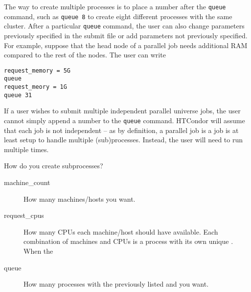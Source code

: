 
The way to create multiple processes is to place a number after the \verb=queue= 
command, such as \verb=queue 8= to create eight different processes with the 
same cluster. After a particular \verb=queue= command, the user can also change 
parameters previously specified in the submit file or add parameters not 
previously specified. For example, suppose that the head node of a parallel job 
needs additional RAM compared to the rest of the nodes. The user can write

\begin{verbatim}
request_memory = 5G
queue
request_meory = 1G
queue 31
\end{verbatim}

If a user wishes to submit multiple independent parallel universe jobs, the 
user cannot simply append a number to the \verb=queue= command. HTCondor will 
assume that each job is not independent -- as by definition, a parallel job is a 
job is at least setup to handle multiple (sub)processes. Instead, the user will
need to run  multiple times.

How do you create subprocesses?

\begin{description}
\item[machine\_count] How many machines/hosts you want.
\item[request\_cpus] How many CPUs each machine/host should have available. Each 
combination of machines and CPUs is a process with its own unique .
When the 
\item[queue ] How many processes with the previously listed 
 and  you want.
\end{description}


